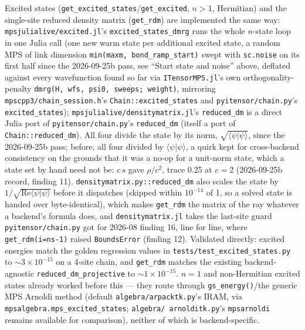 \documentclass[11pt]{article}
\begin{document}
Excited states (\texttt{get\_excited\_states}/\texttt{get\_excited},
$n>1$, Hermitian) and the single-site reduced density matrix
(\texttt{get\_rdm}) are implemented the same way:
\texttt{mpsjulialive/excited.jl}'s \texttt{excited\_states\_dmrg} runs
the whole $n$-state loop in one Julia call (one new warm state per
additional excited state, a random MPS of link dimension
\texttt{min(maxm, bond\_ramp\_start)} swept with \texttt{sc.noise} on its
first half since the 2026-09-25b pass, see ``Start state and noise''
above, deflated against every wavefunction found so far via
\texttt{ITensorMPS.jl}'s own orthogonality-penalty
\texttt{dmrg(H, wfs, psi0, sweeps; weight)}, mirroring
\texttt{mpscpp3/chain\_session.h}'s \texttt{Chain::excited\_states} and
\texttt{pyitensor/chain.py}'s \texttt{excited\_states});
\texttt{mpsjulialive/densitymatrix.jl}'s \texttt{reduced\_dm} is a
direct Julia port of \texttt{pyitensor/chain.py}'s \texttt{reduced\_dm}
(itself a port of \texttt{Chain::reduced\_dm}). All four divide the state
by its norm, $\sqrt{\langle\psi|\psi\rangle}$, since the 2026-09-25b pass;
before, all four divided by $\langle\psi|\psi\rangle$, a quirk kept for
cross-backend consistency on the grounds that it was a no-op for a
unit-norm state, which a state set by hand need not be: $c\,s$ gave
$\rho/c^2$, trace 0.25 at $c=2$ (2026-09-25b record, finding 11).
\texttt{densitymatrix.py::reduced\_dm} also scales the state by
$1/\sqrt{\mathrm{Re}\langle\psi|\psi\rangle}$ before it dispatches
(skipped within $10^{-14}$ of 1, so a solved state is handed over
byte-identical), which makes \texttt{get\_rdm} the matrix of the ray
whatever a backend's formula does, and \texttt{densitymatrix.jl} takes the
last-site guard \texttt{pyitensor/chain.py} got for 2026-08 finding 16,
line for line, where \texttt{get\_rdm(i=ns-1)} raised
\texttt{BoundsError} (finding 12). Validated directly: excited
energies match the golden regression values in
\texttt{tests/test\_excited\_states.py} to $\sim 3 \times 10^{-15}$ on a
4-site chain, and \texttt{get\_rdm} matches the existing
backend-agnostic \texttt{reduced\_dm\_projective} to
$\sim 1 \times 10^{-15}$. $n=1$ and non-Hermitian excited states already
worked before this --- they route through \texttt{gs\_energy()}/the
generic MPS Arnoldi method (default \texttt{algebra/arpacktk.py}'s
IRAM, via \texttt{mpsalgebra.mps\_excited\_states}; \texttt{algebra/
arnolditk.py}'s \texttt{mpsarnoldi} remains available for comparison),
neither of which is backend-specific.
\end{document}
